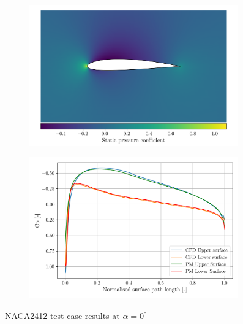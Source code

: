 \documentclass{article}
\begin{document}
\begin{figure}[H]
    \centering
    \begin{subfigure}{0.49\textwidth}
        \centering
        \includegraphics[width=0.99\textwidth]{figures/naca2412_cp_0.0.png}
        \caption{}
        \label{fig:naca2412_cp}
    \end{subfigure}
    \begin{subfigure}{0.49\textwidth}
        \centering
        \includegraphics[width=0.99\textwidth]{figures/naca2412_surface_cp_0.0.png}
        \caption{}
        \label{fig:naca2412_surface_cp}
    \end{subfigure}
    \caption{NACA2412 test case results at $\alpha = 0^\circ$}
\end{figure}
\end{document}
